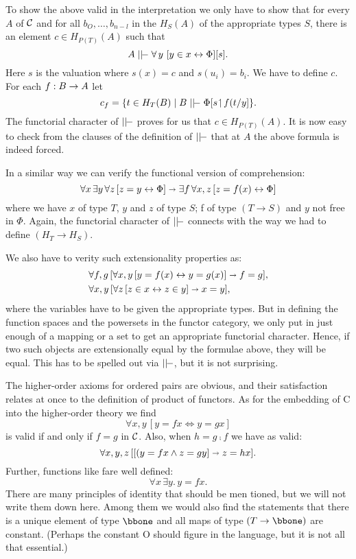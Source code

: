 To show the above valid in the interpretation we only have
to show that for every $A$ of $\mathcal C$ and for all $b_O, \dots ,b_{n-l}$ in the $H_S(A)$ of the appropriate types $S$, there is an element
$c \in H_{P(T)}(A)$ such that
$$
A \mm \forall\, y \,\, [y \in x \iff \Phi][s] .
$$
%
Here $s$ is the valuation where $s(x) = c$ and $s(u_i) = b_i$. We have to define $c$. For each $f: B \rightarrow A$ let
$$
c_f = \{t \in H_T(B) \mid B \mm \Phi [s \res f(t/y] \} .
$$
%
The functorial character of $\mm$ proves for us that $c \in H_{P(T)}(A)$. It is now easy to check from the clauses of the definition of $\mm$ that at $A$ the above formula is indeed forced.

In a similar way we can verify the functional version of comprehension:
$$
\forall x \, \exists y \, \forall z \, [ z = y \leftrightarrow \Phi] \shortrightarrow \exists f\, \forall x,z\, [z = f(x) \leftrightarrow \Phi ]
$$
%
where we have $x$ of type $T$, $y$ and $z$ of type $S$; f of type $(T\to S)$ and $y$ not free in $\Phi$. Again, the functorial character of $\mm$
connects with the way we had to define $(H_T \to H_S)$.

We also have to verity such extensionality properties as:
\begin{align*}
&\forall f,g \, [\forall x,y \, [ y = f(x) \leftrightarrow y = g(x) ] \shortrightarrow f = g],\\
&\forall x,y \, [\forall z \, [ z \in x \leftrightarrow z \in y ] \shortrightarrow x = y],
\end{align*}
%
where the variables have to be given the appropriate types. But in defining the function spaces and the powersets in the functor category, we only put in just enough of a mapping or a set to get an appropriate functorial character. Hence, if two such objects are extensionally equal by the formulae above, they will be equal. This has to be spelled out via $\mm$, but it is not surprising.

The higher-order axioms for ordered pairs are obvious, and their satisfaction relates at once to the definition of product of functors. As for the embedding of C into the higher-order theory we find
$$
\forall x,y \, [y = f x \iff y = gx]
$$
is valid if and only if $f = g$ in $\mathcal C$. Also, when $h = g \comp f$ we have as valid:
$$
\forall x,y,z\, [[(y = fx \land z = gy] \shortrightarrow z = hx].
$$
Further, functions like fare well defined:
$$
\forall x\, \exists y.\, y = fx .
$$
There are many principles of identity that should be men tioned, but we will not write them down here. Among them we would also find the statements that there is a unique element of type $\bbone$ and all maps of type $(T\to \bbone )$ are constant. (Perhaps the constant O should figure in the language, but it is not all
that essential.)

